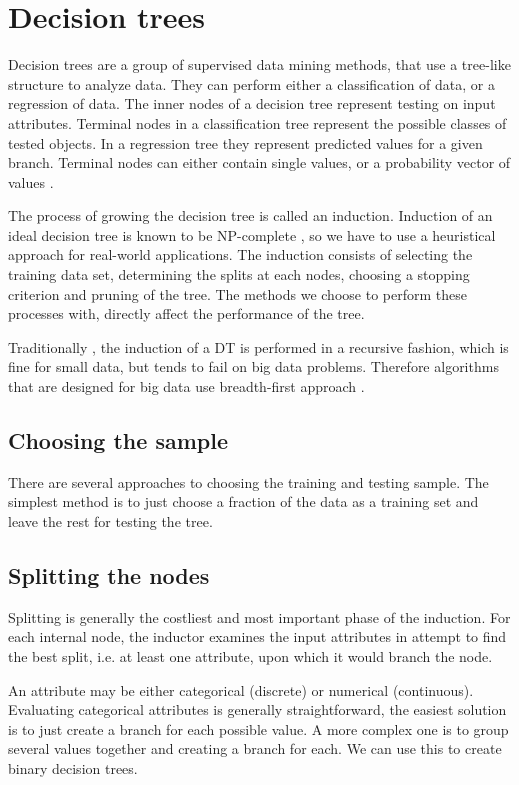 \documentclass[thesis=B,english]{FITthesis}[2012/10/20]
\begin{document}
\chapter{Decision trees}
\label{chap:DT}
		Decision trees are a group of supervised data mining methods, that use a tree-like structure to analyze data. They can perform either a classification of data, or a regression of data. The inner nodes of a decision tree represent testing on input attributes. \cite{CMP07} Terminal nodes in a classification tree represent the possible classes of tested objects. In a regression tree they represent predicted values for a given branch. Terminal nodes can either contain single values, or a probability vector of values \cite{TOP_DOWN_INDUCTION_SURVEY}. 

		The process of growing the decision tree is called an induction. Induction of an ideal decision tree is known to be NP-complete \cite{NP-COMPLETE}, so we have to use a heuristical approach for real-world applications. The induction consists of selecting the training data set, determining the splits at each nodes, choosing a stopping criterion and pruning of the tree. The methods we choose to perform these processes with, directly affect the performance of the tree. 

		Traditionally \cite{CART,C45-NUMERICAL}, the induction of a DT is performed in a recursive fashion, which is fine for small data, but tends to fail on big data problems. Therefore algorithms that are designed for big data use breadth-first approach \cite{mehta1996sliq,ben2010streaming}.

		\section{Choosing the sample}
			There are several approaches to choosing the training and testing sample. The simplest method is to just choose a fraction of the data as a training set and leave the rest for testing the tree. 
		
		\section{Splitting the nodes}
			Splitting is generally the costliest and most important phase of the induction. For each internal node, the inductor examines the input attributes in attempt to find the best split, i.e. at least one attribute, upon which it would branch the node. 

			An attribute may be either categorical (discrete) or numerical (continuous). Evaluating categorical attributes is generally straightforward, the easiest solution is to just create a branch for each possible value. A more complex one is to group several values together and creating a branch for each. We can use this to create binary decision trees.
\end{document}
